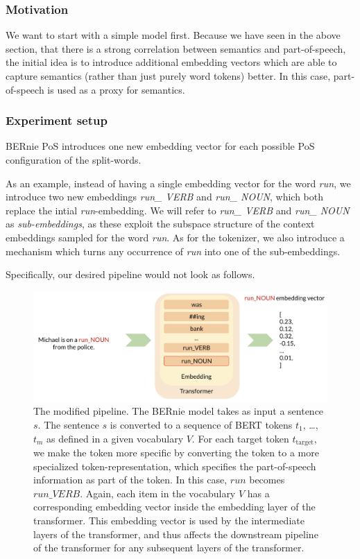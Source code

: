 \documentclass[a4paper,12pt,twoside,openright]{report}
\begin{document}
\subsubsection{Motivation}

We want to start with a simple model first.
Because we have seen in the above section, that there is a strong correlation between semantics and part-of-speech, the initial idea is to introduce additional embedding vectors which are able to capture semantics (rather than just purely word tokens) better.
In this case, part-of-speech is used as a proxy for semantics.

\subsubsection{Experiment setup}

BERnie PoS introduces one new embedding vector for each possible PoS configuration of the split-words.

As an example, instead of having a single embedding vector for the word \textit{run}, we introduce two new embeddings \textit{run\_  VERB} and \textit{run\_ NOUN}, which both replace the intial \textit{run}-embedding. 
We will refer to \textit{run\_ VERB} and \textit{run\_ NOUN} as \textit{sub-embeddings}, as these exploit the subspace structure of the context embeddings sampled for the word \textit{run}.
As for the tokenizer, we also introduce a mechanism which turns any occurrence of \textit{run} into one of the sub-embeddings.

Specifically, our desired pipeline would not look as follows.

\begin{figure}[H]
	\center
  \includegraphics[width=\linewidth]{./assets/experiments/pipeline_tokenizer_BERnie_POS_input.png}
  \caption{The modified pipeline. 
  The BERnie model takes as input a sentence $s$. The sentence $s$ is converted to a sequence of BERT tokens $t_1$, \ldots, $t_m$ as defined in a given vocabulary $V$.
For each target token $t_{\text{target}}$, we make the token more specific by converting the token to a more specialized token-representation, which specifies the part-of-speech information as part of the token.
In this case, $run$ becomes $run\_ VERB$.
Again, each item in the vocabulary $V$ has a corresponding embedding vector inside the embedding layer of the transformer.
This embedding vector is used by the intermediate layers of the transformer, and thus affects the downstream pipeline of the transformer for any subsequent layers of the transformer.
}
  \label{fig:BERnie_POS_pipeline}
\end{figure}
\end{document}
